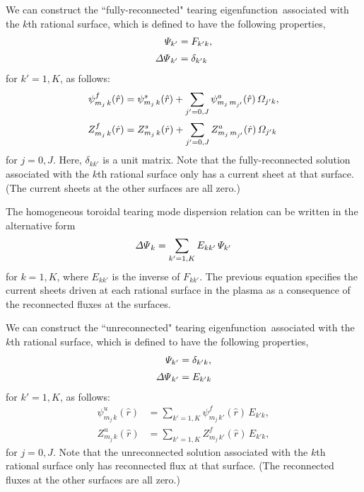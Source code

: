 \documentclass[12pt,prb,aps]{revtex4-1}
\begin{document}
We can construct the ``fully-reconnected" tearing eigenfunction\,\cite{am1} associated with the $k$th rational surface,
which is defined to have the following properties, 
\begin{align}
{\mit\Psi}_{k' }&= F_{k'k},\\[0.5ex]
{\mit\Delta\Psi}_{k'} &= \delta_{k'k}
\end{align}
for $k'=1,K$, 
as follows: 
\begin{align}
\psi_{m_j\,k}^{f}(\hat{r}) &=\psi^s_{m_j\,k}(\hat{r})+ \sum_{j'=0,J}\psi_{m_j\,m_{j'}}^a(\hat{r})\,{\mit\Omega}_{j'k},\\[0.5ex]
Z_{m_j\,k}^{f}(\hat{r}) &=Z^s_{m_j\,k}(\hat{r})+ \sum_{j'=0,J}Z_{m_j\,m_{j'}}^a(\hat{r})\,{\mit\Omega}_{j'k}
\end{align}
for $j=0,J$. Here, $\delta_{kk'}$ is a unit matrix.  Note that the fully-reconnected solution associated with the $k$th rational surface only has a current sheet at that surface. 
(The current sheets at the other surfaces are all zero.)

The homogeneous toroidal tearing mode dispersion relation can be written in the alternative form\,\cite{cht,am1}
\begin{equation}\label{e317}
{\mit\Delta\Psi}_k = \sum_{k'=1,K}E_{kk'}\,{\mit\Psi}_{k'}
\end{equation}
for $k=1,K$, where $E_{kk'}$ is the inverse of $F_{kk'}$. The previous equation specifies the current sheets driven at each rational surface
in the plasma as a consequence of the reconnected fluxes at the surfaces. 

We can construct the ``unreconnected" tearing eigenfunction\,\cite{am1} associated with the $k$th rational surface,
which is defined to have the following properties, 
\begin{align}
{\mit\Psi}_{k' }&= \delta_{k'k},\\[0.5ex]
{\mit\Delta\Psi}_{k'} &= E_{k'k}
\end{align}
for $k'=1,K$, 
as follows: 
\begin{align}
\psi_{m_j\,k}^{u}(\hat{r}) &=\sum_{k'=1,K}\psi_{m_j\,k'}^{f}(\hat{r})\,E_{k'k},\\[0.5ex]
Z_{m_j\,k}^{u}(\hat{r}) &=\sum_{k'=1,K}Z_{m_j\,k'}^{f}(\hat{r})\,E_{k'k},
\end{align}
for $j=0,J$.  Note that the unreconnected solution associated with the $k$th rational surface only has reconnected flux at that surface. 
(The reconnected fluxes at the other surfaces are all zero.)
\end{document}
